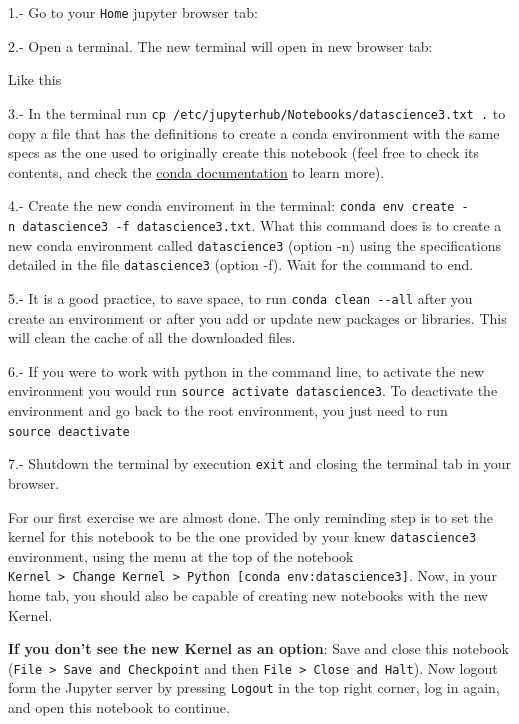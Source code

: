 \documentclass[11pt]{article}
\begin{document}
1.- Go to your \texttt{Home} jupyter browser tab:

    

    2.- Open a terminal. The new terminal will open in new browser tab:

    

    Like this

    

    3.- In the terminal run
\texttt{cp\ /etc/jupyterhub/Notebooks/datascience3.txt\ .} to copy a
file that has the definitions to create a conda environment with the
same specs as the one used to originally create this notebook (feel free
to check its contents, and check the
\href{https://conda.io/docs/index.html}{conda documentation} to learn
more).

4.- Create the new conda enviroment in the terminal:
\texttt{conda\ env\ create\ -n\ datascience3\ -f\ datascience3.txt}.
What this command does is to create a new conda environment called
\texttt{datascience3} (option -n) using the specifications detailed in
the file \texttt{datascience3} (option -f). Wait for the command to end.

5.- It is a good practice, to save space, to run
\texttt{conda\ clean\ -\/-all} after you create an environment or after
you add or update new packages or libraries. This will clean the cache
of all the downloaded files.

6.- If you were to work with python in the command line, to activate the
new environment you would run \texttt{source\ activate\ datascience3}.
To deactivate the environment and go back to the root environment, you
just need to run \texttt{source\ deactivate}

7.- Shutdown the terminal by execution \texttt{exit} and closing the
terminal tab in your browser.

For our first exercise we are almost done. The only reminding step is to
set the kernel for this notebook to be the one provided by your knew
\texttt{datascience3} environment, using the menu at the top of the
notebook
\texttt{Kernel\ \textgreater{}\ Change\ Kernel\ \textgreater{}\ Python\ {[}conda\ env:datascience3{]}}.
Now, in your home tab, you should also be capable of creating new
notebooks with the new Kernel.

\textbf{If you don't see the new Kernel as an option}: Save and close
this notebook (\texttt{File\ \textgreater{}\ Save\ and\ Checkpoint} and
then \texttt{File\ \textgreater{}\ Close\ and\ Halt}). Now logout form
the Jupyter server by pressing \texttt{Logout} in the top right corner,
log in again, and open this notebook to continue.
\end{document}
